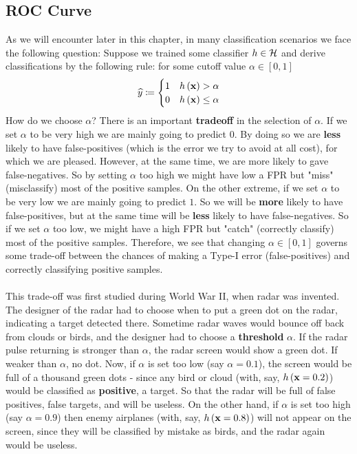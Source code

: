 \subsection{ROC Curve}\label{roc}
As we will encounter later in this chapter, in many classification scenarios we face the following question: Suppose we trained some classifier $h\in \mathcal{H}$ and derive classifications by the following rule: for some cutoff value $\alpha \in \left[0,1\right]$ $$\widehat{y}\coloneqq\begin{cases}
1 & h\left(\mathbf{x}\right)>\alpha\\
0 & h\left(\mathbf{x}\right)\leq\alpha
\end{cases}$$
How do we choose $\alpha$? There is an important \textbf{tradeoff} in the selection of $\alpha$. If we set $\alpha$ to be very high we are mainly going to predict $0$. By doing so we are \textbf{less} likely to have false-positives (which is the error we try to avoid at all cost), for which we are pleased. However, at the same time, we are  more likely to gave false-negatives. So by setting $\alpha$ too high we might have low a FPR but "miss" (misclassify) most of the positive samples. On the other extreme, if we set $\alpha$ to be very low we are mainly going to predict $1$. So we will be \textbf{more} likely to have false-positives, but at the same time will be \textbf{less} likely to have false-negatives. So if we set $\alpha$ too low, we might have a high FPR but "catch" (correctly classify) most of the positive samples. Therefore, we see that changing $\alpha\in\left[0,1\right]$ governs some trade-off between the chances of making a Type-I error (false-positives) and correctly classifying positive samples.
\\~\\
This trade-off was first studied during World War II, when radar was invented. The designer of the radar had to choose when to put a green dot on the radar, indicating a target detected there. Sometime radar waves would bounce off back from clouds or birds, and the designer had to choose a \textbf{threshold} $\alpha$. If the radar pulse returning is stronger than $\alpha$, the radar screen would show a green dot. If weaker than $\alpha$, no dot. Now, if $\alpha$ is set too low (say $\alpha=0.1$), the screen would be full of a thousand green dots - since any bird or cloud (with, say, $h\left(\mathbf{x}=0.2\right)$) would be classified as \textbf{positive}, a target. So that the radar will be full of false positives, false targets, and will be useless. On the other hand, if $\alpha$ is set too high (say $\alpha=0.9$) then enemy airplanes  (with, say, $h\left(\mathbf{x}=0.8\right)$) will not appear on the screen, since they will be classified by mistake as birds, and the radar again would be useless. 

